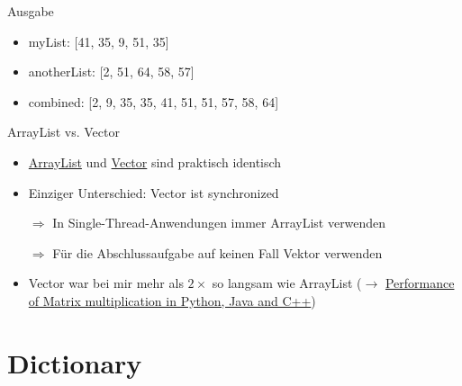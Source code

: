 \documentclass[usepdftitle=false,hyperref={pdfpagelabels=false}]{beamer}
\begin{document}
\begin{frame}{Ausgabe}
    \begin{itemize}
        \item myList: [41, 35, 9, 51, 35]
        \item anotherList: [2, 51, 64, 58, 57]
        \item combined: [2, 9, 35, 35, 41, 51, 51, 57, 58, 64]
    \end{itemize}
\end{frame}

\begin{frame}{ArrayList vs. Vector}
    \begin{itemize}
        \item \href{http://docs.oracle.com/javase/7/docs/api/java/util/ArrayList.html}{ArrayList} und \href{http://docs.oracle.com/javase/7/docs/api/java/util/Vector.html}{Vector} sind praktisch identisch
        \item Einziger Unterschied: Vector ist synchronized
        \item[$\Rightarrow$] In Single-Thread-Anwendungen immer ArrayList verwenden
        \item[$\Rightarrow$] Für die Abschlussaufgabe auf keinen Fall Vektor verwenden
        \item Vector war bei mir mehr als $2 \times$ so langsam wie ArrayList ($\rightarrow$ \href{http://martin-thoma.com/matrix-multiplication-python-java-cpp/\#Java}{Performance of Matrix multiplication in Python, Java and C++})
    \end{itemize}
\end{frame}

\section{Dictionary}
\end{document}
